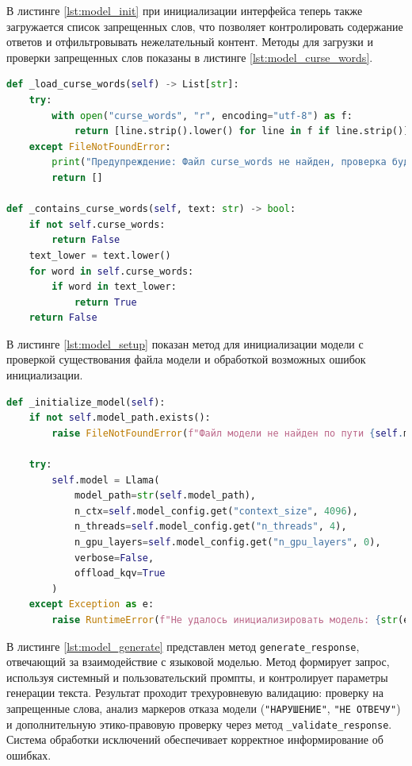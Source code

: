 В листинге \ref{lst:model_init} при инициализации интерфейса теперь также загружается список запрещенных слов, что позволяет контролировать содержание ответов и отфильтровывать нежелательный контент. Методы для загрузки и проверки запрещенных слов показаны в листинге \ref{lst:model_curse_words}.

\begin{lstlisting}[caption={Методы проверки запрещенных слов}, label=lst:model_curse_words, language=Python]
def _load_curse_words(self) -> List[str]:
	try:
		with open("curse_words", "r", encoding="utf-8") as f:
			return [line.strip().lower() for line in f if line.strip()]
	except FileNotFoundError:
		print("Предупреждение: Файл curse_words не найден, проверка будет пропущена")
		return []

def _contains_curse_words(self, text: str) -> bool:
	if not self.curse_words:
		return False
	text_lower = text.lower()
	for word in self.curse_words:
		if word in text_lower:
			return True
	return False
\end{lstlisting}

В листинге \ref{lst:model_setup} показан метод для инициализации модели с проверкой существования файла модели и обработкой возможных ошибок инициализации.

\newpage

\begin{lstlisting}[caption={Инициализация модели с проверкой}, label=lst:model_setup, language=Python]
def _initialize_model(self):
	if not self.model_path.exists():
		raise FileNotFoundError(f"Файл модели не найден по пути {self.model_path}")

	try:
		self.model = Llama(
			model_path=str(self.model_path),
			n_ctx=self.model_config.get("context_size", 4096),
			n_threads=self.model_config.get("n_threads", 4),
			n_gpu_layers=self.model_config.get("n_gpu_layers", 0),
			verbose=False,
			offload_kqv=True
		)
	except Exception as e:
		raise RuntimeError(f"Не удалось инициализировать модель: {str(e)}")
\end{lstlisting}

В листинге \ref{lst:model_generate} представлен метод \texttt{generate\_response}, отвечающий за взаимодействие с языковой моделью. Метод формирует запрос, используя системный и пользовательский промпты, и контролирует параметры генерации текста. Результат проходит трехуровневую валидацию: проверку на запрещенные слова, анализ маркеров отказа модели (\texttt{"НАРУШЕНИЕ"}, \texttt{"НЕ ОТВЕЧУ"}) и дополнительную этико-правовую проверку через метод \texttt{\_validate\_response}. Система обработки исключений обеспечивает корректное информирование об ошибках.

